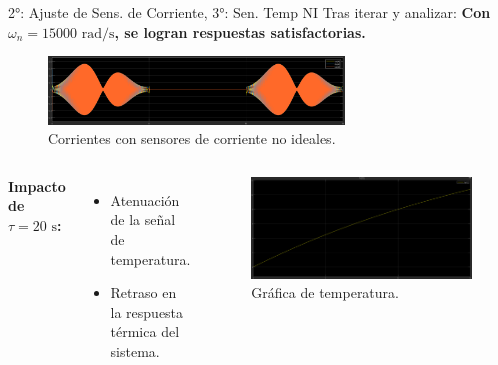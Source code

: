 \documentclass[12pt]{beamer}
\begin{document}
\begin{frame}{2°: Ajuste de Sens. de Corriente, 3°: Sen. Temp NI}
Tras iterar y analizar: 
    \textbf{Con \(\omega_n = 15000 \text{ rad/s}\), se logran respuestas satisfactorias.}
    \begin{figure}
        \centering
        \includegraphics[width=0.7\textwidth]{Imagenes/9_corNI_15000_c.png}
        \caption{Corrientes con sensores de corriente no ideales.}
    \end{figure}

    \begin{columns}
        \textbf{Impacto de \(\tau = 20 \text{ s}\):}
        \begin{itemize}
            \item Atenuación de la señal de temperatura.
            \item Retraso en la respuesta térmica del sistema.
        \end{itemize}

        \begin{figure}
            \centering
            \includegraphics[width=1\textwidth]{Imagenes/11_temNI_20.png}
            \caption{Gráfica de temperatura.}
        \end{figure}
    \end{columns}
\end{frame}
\end{document}
